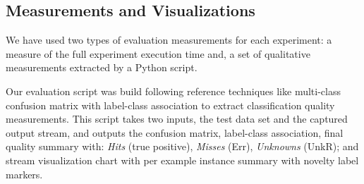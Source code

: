 






\subsection{Measurements and Visualizations}

We have used two types of evaluation measurements for each experiment:
a measure of the full experiment execution time
and, a set of qualitative measurements extracted by a Python script.

Our evaluation script was build following reference techniques like
multi-class confusion matrix with label-class association \cite{Faria2015minas}
to extract classification quality measurements.
This script takes two inputs, the test data set and the captured output stream,
and outputs the confusion matrix, label-class association,
final quality summary with:
\emph{Hits} (true positive), \emph{Misses} (Err), \emph{Unknowns} (UnkR); and
stream visualization chart with per example instance summary with novelty label markers.
% 

